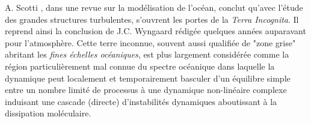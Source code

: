 A. Scotti \citep{scotti_large_2010}, dans une revue sur la modélisation de l'océan, conclut qu’avec l'étude des grandes structures turbulentes, s'ouvrent les portes de la \textit{Terra Incognita}. Il reprend ainsi la conclusion de J.C. Wyngaard \citep{wyngaard_toward_2004} rédigée quelques années auparavant pour l'atmosphère. Cette terre inconnue, souvent aussi qualifiée de "zone grise" abritant les \textit{fines échelles océaniques}, est plus largement considérée comme la région particulièrement mal connue du spectre océanique dans laquelle la dynamique peut localement et temporairement basculer d'un équilibre simple entre un nombre limité de processus à une dynamique non-linéaire complexe induisant une cascade (directe) d'instabilités dynamiques aboutissant à la dissipation moléculaire. 
\color{black}
\color{blue}
